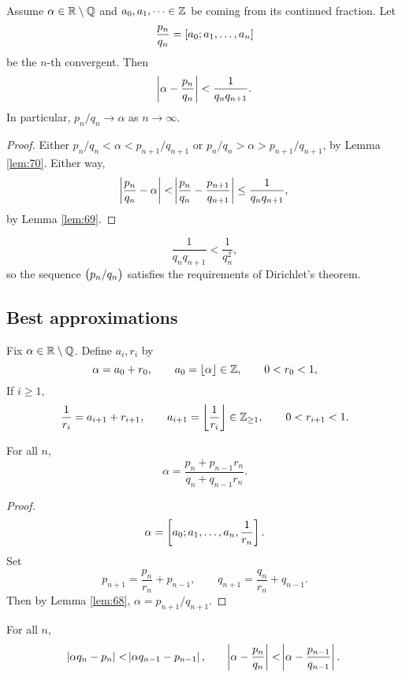 \begin{corollary}
Assume $ \alpha \in \mathbb{R} \setminus \mathbb{Q} $ and $ a_0, a_1, \dots \in \mathbb{Z} $ be coming from its continued fraction. Let
$$ \dfrac{p_n}{q_n} = \sbr{a_0; a_1, \dots, a_n} $$
be the $ n $-th convergent. Then
$$ \abs{\alpha - \dfrac{p_n}{q_n}} < \dfrac{1}{q_nq_{n + 1}}. $$
In particular, $ p_n / q_n \to \alpha $ as $ n \to \infty $.
\end{corollary}

\begin{proof}
Either $ p_n / q_n < \alpha < p_{n + 1} / q_{n + 1} $ or $ p_n / q_n > \alpha > p_{n + 1} / q_{n + 1} $, by Lemma \ref{lem:70}. Either way,
$$ \abs{\dfrac{p_n}{q_n} - \alpha} < \abs{\dfrac{p_n}{q_n} - \dfrac{p_{n + 1}}{q_{n + 1}}} \le \dfrac{1}{q_nq_{n + 1}}, $$
by Lemma \ref{lem:69}.
\end{proof}

\begin{note*}
$$ \dfrac{1}{q_nq_{n + 1}} < \dfrac{1}{q_n^2}, $$
so the sequence $ \br{p_n / q_n} $ satisfies the requirements of Dirichlet's theorem.
\end{note*}

\pagebreak

\subsection{Best approximations}

Fix $ \alpha \in \mathbb{R} \setminus \mathbb{Q} $. Define $ a_i, r_i $ by
$$ \alpha = a_0 + r_0, \qquad a_0 = \left\lfloor \alpha \right\rfloor \in \mathbb{Z}, \qquad 0 < r_0 < 1, $$
If $ i \ge 1 $,
$$ \dfrac{1}{r_i} = a_{i + 1} + r_{i + 1}, \qquad a_{i + 1} = \left\lfloor \dfrac{1}{r_i} \right\rfloor \in \mathbb{Z}_{\ge 1}, \qquad 0 < r_{i + 1} < 1. $$

\begin{lemma}
\label{lem:72}
For all $ n $,
$$ \alpha = \dfrac{p_n + p_{n - 1}r_n}{q_n + q_{n - 1}r_n}. $$
\end{lemma}

\begin{proof}
$$ \alpha = \sbr{a_0; a_1, \dots, a_n, \dfrac{1}{r_n}}. $$
Set
$$ p_{n + 1} = \dfrac{p_n}{r_n} + p_{n - 1}, \qquad q_{n + 1} = \dfrac{q_n}{r_n} + q_{n - 1}. $$
Then by Lemma \ref{lem:68}, $ \alpha = p_{n + 1} / q_{n + 1} $.
\end{proof}

\begin{corollary}
For all $ n $,
$$ \abs{\alpha q_n - p_n} < \abs{\alpha q_{n - 1} - p_{n - 1}}, \qquad \abs{\alpha - \dfrac{p_n}{q_n}} < \abs{\alpha - \dfrac{p_{n - 1}}{q_{n - 1}}}. $$
\end{corollary}

